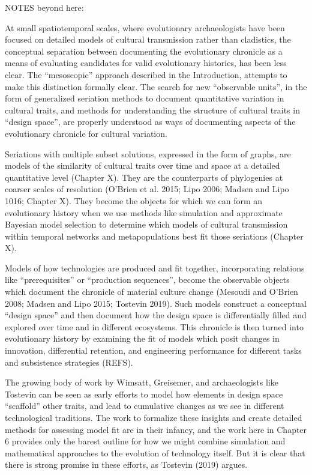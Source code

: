 NOTES beyond here:

At small spatiotemporal scales, where evolutionary archaeologists have been focused on detailed models of cultural transmission rather than cladistics, the conceptual separation between documenting the evolutionary chronicle as a means of evaluating candidates for valid evolutionary histories, has been less clear.  The “mesoscopic” approach described in the Introduction, attempts to make this distinction formally clear.  The search for new “observable units”, in the form of generalized seriation methods to document quantitative variation in cultural traits, and methods for understanding the structure of cultural traits in “design space”, are properly understood as ways of documenting aspects of the evolutionary chronicle for cultural variation.  

Seriations with multiple subset solutions, expressed in the form of graphs, are models of the similarity of cultural traits over time and space at a detailed quantitative level (Chapter X).  They are the counterparts of phylogenies at coarser scales of resolution (O’Brien et al. 2015; Lipo 2006; Madsen and Lipo 1016; Chapter X).  They become the objects for which we can form an evolutionary history when we use methods like simulation and approximate Bayesian model selection to determine which models of cultural transmission within temporal networks and metapopulations best fit those seriations (Chapter X).  

Models of how technologies are produced and fit together, incorporating relations like “prerequisites” or “production sequences”, become the observable objects which document the chronicle of material culture change (Mesoudi and O’Brien 2008; Madsen and Lipo 2015; Tostevin 2019).  Such models construct a conceptual “design space” and then document how the design space is differentially filled and explored over time and in different ecosystems.  This chronicle is then turned into evolutionary history by examining the fit of models which posit changes in innovation, differential retention, and engineering performance for different tasks and subsistence strategies (REFS).  

The growing body of work by Wimsatt, Greisemer, and archaeologists like Tostevin can be seen as early efforts to model how elements in design space “scaffold” other traits, and lead to cumulative changes as we see in different technological traditions.  The work to formalize these insights and create detailed methods for assessing model fit are in their infancy, and the work here in Chapter 6 provides only the barest outline for how we might combine simulation and mathematical approaches to the evolution of technology itself.  But it is clear that there is strong promise in these efforts, as Tostevin (2019) argues.  

